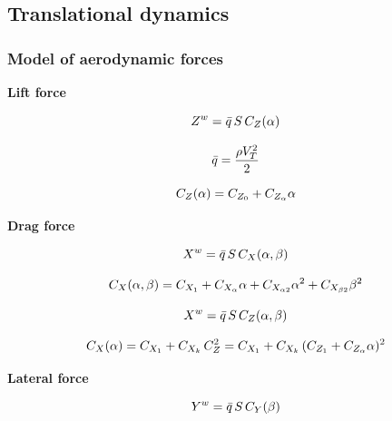 \subsection{Translational dynamics}

\subsubsection{Model of aerodynamic forces}


\textbf{Lift force}

\begin{equation}{\label{eqn:liftForce}}
Z^w = \bar{q} \, S \,  C_Z(\alpha)
\end{equation}

\begin{equation}{\label{eqn:dynamicPressure}}
\bar{q} = \frac{\rho V_T^2}{2} 
\end{equation}

\begin{equation}{\label{eqn:liftCoef}}
C_Z(\alpha) = C_{Z_0} + C_{Z_{\alpha}} \alpha 
\end{equation}



\textbf{Drag force}

\begin{equation}{\label{eqn:dragForceETHcraft}}
X^w = \bar{q} \, S \,  C_X(\alpha, \beta)
\end{equation}

\begin{equation}{\label{eqn:dragCoeffETHcraft}}
C_X(\alpha, \beta) = C_{X_1} + C_{X_{\alpha}} \alpha + C_{X_{\alpha 2}} {\alpha}^2 + C_{X_{\beta 2}} {\beta}^2 
\end{equation}

\begin{equation}{\label{eqn:dragForceMAKO}}
X^w = \bar{q} \, S \, C_{Z}(\alpha, \beta)
\end{equation}

\begin{equation}{\label{eqn:dragCoeffMAKO}}
C_X(\alpha) = C_{X_1} + C_{X_k} \, C_Z^2 = C_{X_1} + C_{X_k} \, (C_{Z_1} + C_{Z_{\alpha}} \alpha )^2
\end{equation}


\textbf{Lateral force}

\begin{equation}{\label{eqn:lateralForceETHcraft}}
Y^w = \bar{q} \, S \,  C_Y(\beta)
\end{equation}

